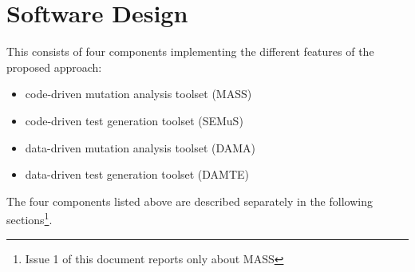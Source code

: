 
\chapter{Software Design}

This \FAQAS consists of four components implementing the different features of the proposed approach:
\begin{itemize}
	\item code-driven mutation analysis toolset (MASS)
	\item code-driven test generation toolset (SEMuS)
	\item data-driven mutation analysis toolset (DAMA)
	\item data-driven test generation toolset (DAMTE)
\end{itemize}

The four components listed above are described separately in the following sections\footnote{Issue 1 of this document reports only about MASS}.


